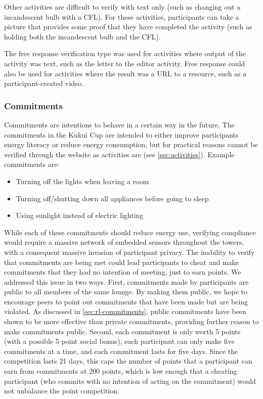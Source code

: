 Other activities are difficult to verify with text only (such as changing out a incandescent bulb with a CFL). For these activities, participants can take a picture that provides some proof that they have completed the activity (such as holding both the incandescent bulb and the CFL).

The free response verification type was used for activities where output of the activity was text, such as the letter to the editor activity. Free response could also be used for activities where the result was a URL to a resource, such as a participant-created video.


\subsubsection{Commitments}

Commitments are intentions to behave in a certain way in the future. The commitments in the Kukui Cup are intended to either improve participants energy literacy or reduce energy consumption, but for practical reasons cannot be verified through the website as activities are (see \autoref{sec:activities}). Example commitments are:

\begin{itemize}
	\item Turning off the lights when leaving a room
	\item Turning off/shutting down all appliances before going to sleep
	\item Using sunlight instead of electric lighting
\end{itemize}

While each of these commitments should reduce energy use, verifying compliance would require a massive network of embedded sensors throughout the towers, with a consequent massive invasion of participant privacy. The inability to verify that commitments are being met could lead participants to cheat and make commitments that they had no intention of meeting, just to earn points. We addressed this issue in two ways. First, commitments made by participants are public to all members of the same lounge. By making them public, we hope to encourage peers to point out commitments that have been made but are being violated. As discussed in \autoref{sec:rl-commitments}, public commitments have been shown to be more effective than private commitments, providing further reason to make commitments public. Second, each commitment is only worth 5 points (with a possible 5 point social bonus), each participant can only make five commitments at a time, and each commitment lasts for five days. Since the competition lasts 21 days, this caps the number of points that a participant can earn from commitments at 200 points, which is low enough that a cheating participant (who commits with no intention of acting on the commitment) would not unbalance the point competition.

